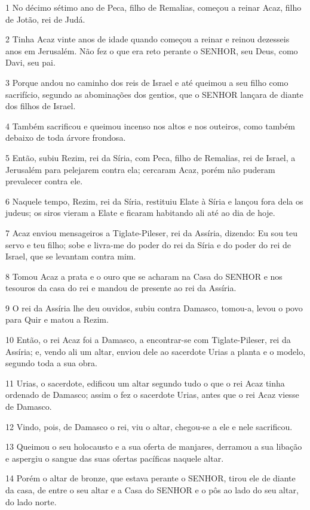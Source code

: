 \par 1 No décimo sétimo ano de Peca, filho de Remalias, começou a reinar Acaz, filho de Jotão, rei de Judá.
\par 2 Tinha Acaz vinte anos de idade quando começou a reinar e reinou dezesseis anos em Jerusalém. Não fez o que era reto perante o SENHOR, seu Deus, como Davi, seu pai.
\par 3 Porque andou no caminho dos reis de Israel e até queimou a seu filho como sacrifício, segundo as abominações dos gentios, que o SENHOR lançara de diante dos filhos de Israel.
\par 4 Também sacrificou e queimou incenso nos altos e nos outeiros, como também debaixo de toda árvore frondosa.
\par 5 Então, subiu Rezim, rei da Síria, com Peca, filho de Remalias, rei de Israel, a Jerusalém para pelejarem contra ela; cercaram Acaz, porém não puderam prevalecer contra ele.
\par 6 Naquele tempo, Rezim, rei da Síria, restituiu Elate à Síria e lançou fora dela os judeus; os siros vieram a Elate e ficaram habitando ali até ao dia de hoje.
\par 7 Acaz enviou mensageiros a Tiglate-Pileser, rei da Assíria, dizendo: Eu sou teu servo e teu filho; sobe e livra-me do poder do rei da Síria e do poder do rei de Israel, que se levantam contra mim.
\par 8 Tomou Acaz a prata e o ouro que se acharam na Casa do SENHOR e nos tesouros da casa do rei e mandou de presente ao rei da Assíria.
\par 9 O rei da Assíria lhe deu ouvidos, subiu contra Damasco, tomou-a, levou o povo para Quir e matou a Rezim.
\par 10 Então, o rei Acaz foi a Damasco, a encontrar-se com Tiglate-Pileser, rei da Assíria; e, vendo ali um altar, enviou dele ao sacerdote Urias a planta e o modelo, segundo toda a sua obra.
\par 11 Urias, o sacerdote, edificou um altar segundo tudo o que o rei Acaz tinha ordenado de Damasco; assim o fez o sacerdote Urias, antes que o rei Acaz viesse de Damasco.
\par 12 Vindo, pois, de Damasco o rei, viu o altar, chegou-se a ele e nele sacrificou.
\par 13 Queimou o seu holocausto e a sua oferta de manjares, derramou a sua libação e aspergiu o sangue das suas ofertas pacíficas naquele altar.
\par 14 Porém o altar de bronze, que estava perante o SENHOR, tirou ele de diante da casa, de entre o seu altar e a Casa do SENHOR e o pôs ao lado do seu altar, do lado norte.
